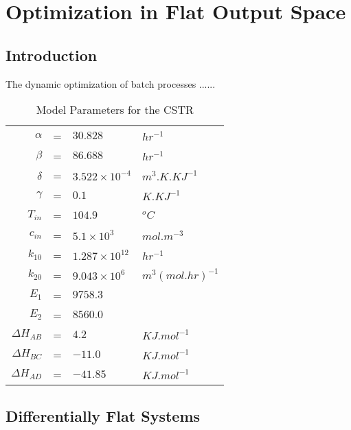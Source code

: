 \documentclass[11pt]{report}
\begin{document}
\chapter{Optimization in Flat Output Space}

\section{Introduction}

The dynamic optimization of batch processes ......

\begin{table}[h]  \centering%
%
\caption{Model Parameters for the CSTR
\label{cstrtable}}\bigskip 

\begin{center}
\begin{tabular}{rlll}
\hline
$\alpha $ & = & $30.828$ & $hr^{-1}$ \\ 
$\beta $ & = & $86.688$ & $hr^{-1}$ \\ 
$\delta $ & = & $3.522\times 10^{-4}$ & $m^{3}.K.KJ^{-1}$ \\ 
$\gamma $ & = & $0.1$ & $K.KJ^{-1}$ \\ 
$T_{in}$ & = & $104.9$ & $^{o}C$ \\ 
$c_{in}$ & = & $5.1\times 10^{3}$ & $mol.m^{-3}$ \\ 
$k_{10}$ & = & $1.287\times 10^{12}$ & $hr^{-1}$ \\ 
$k_{20}$ & = & $9.043\times 10^{6}$ & $m^{3}(mol.hr)^{-1}$ \\ 
$E_{1}$ & = & $9758.3$ &  \\ 
$E_{2}$ & = & $8560.0$ &  \\ 
$\Delta H_{AB}$ & = & $4.2$ & $KJ.mol^{-1}$ \\ 
$\Delta H_{BC}$ & = & $-11.0$ & $KJ.mol^{-1}$ \\ 
$\Delta H_{AD}$ & = & $-41.85$ & $KJ.mol^{-1}$ \\ \hline
\end{tabular}
\end{center}

\end{table}%
%

\section{Differentially Flat Systems}
\end{document}
